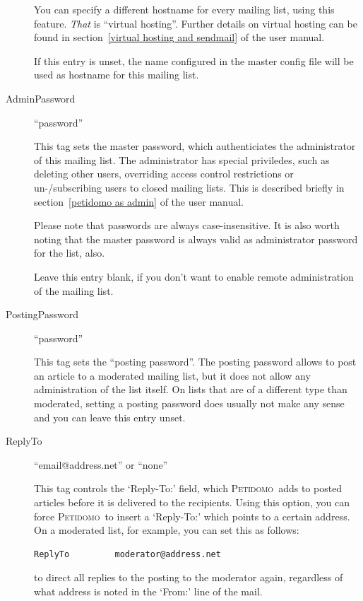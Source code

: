 \documentclass[a4paper]{report}
\newcommand{\Petidomo}{{\scshape Peti\-domo}}
\begin{document}
\begin{description}
You can specify a different hostname for every mailing list, using
this feature. \emph{That} is ``virtual hosting''. Further details on
virtual hosting can be found in section~\ref{virtual hosting and
sendmail} of the user manual.

If this entry is unset, the name configured in the master config file
will be used as hostname for this mailing list.

\item[AdminPassword] \hfill ``password''
\label{list admin password}

This tag sets the master password, which authenticiates the
administrator of this mailing list. The administrator has special
priviledes, such as deleting other users, overriding access control
restrictions or un-/subscribing users to closed mailing lists. This is
described briefly in section~\ref{petidomo as admin} of the user manual.

Please note that passwords are always case-insensitive. It is also
worth noting that the master password is always valid as administrator
password for the list, also.

Leave this entry blank, if you don't want to enable remote
administration of the mailing list.

\item[PostingPassword] \hfill ``password''
\label{posting password}

This tag sets the ``posting password''. The posting password allows to
post an article to a moderated mailing list, but it does not allow any
administration of the list itself. On lists that are of a different
type than moderated, setting a posting password does usually not make
any sense and you can leave this entry unset.

\item[ReplyTo] \hfill ``email@address.net'' or ``none''

This tag controls the `Reply-To:' field, which \Petidomo\ adds to
posted articles before it is delivered to the recipients. Using this
option, you can force \Petidomo\ to insert a `Reply-To:' which points
to a certain address. On a moderated list, for example, you can set
this as follows:
\begin{verbatim}
ReplyTo         moderator@address.net
\end{verbatim}
to direct all replies to the posting to the moderator again,
regardless of what address is noted in the `From:' line of the mail.


\end{description}
\end{document}
